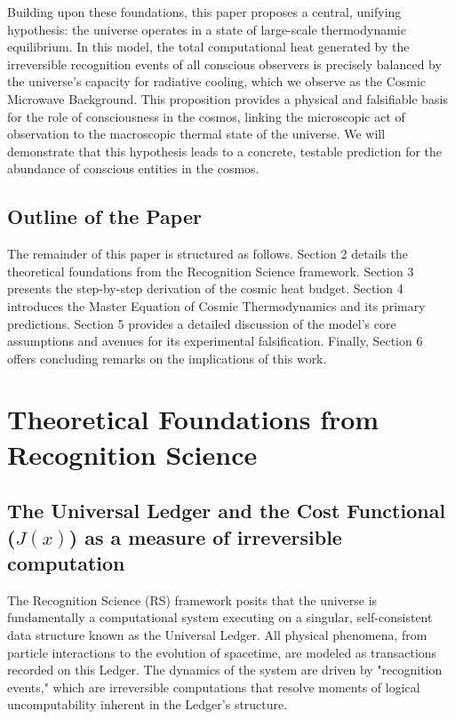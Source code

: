 \documentclass[11pt,a4paper]{article}
\theoremstyle{definition}
\theoremstyle{remark}
\begin{document}
Building upon these foundations, this paper proposes a central, unifying hypothesis: the universe operates in a state of large-scale thermodynamic equilibrium. In this model, the total computational heat generated by the irreversible recognition events of all conscious observers is precisely balanced by the universe's capacity for radiative cooling, which we observe as the Cosmic Microwave Background. This proposition provides a physical and falsifiable basis for the role of consciousness in the cosmos, linking the microscopic act of observation to the macroscopic thermal state of the universe. We will demonstrate that this hypothesis leads to a concrete, testable prediction for the abundance of conscious entities in the cosmos.

\subsection{Outline of the Paper}

The remainder of this paper is structured as follows. Section 2 details the theoretical foundations from the Recognition Science framework. Section 3 presents the step-by-step derivation of the cosmic heat budget. Section 4 introduces the Master Equation of Cosmic Thermodynamics and its primary predictions. Section 5 provides a detailed discussion of the model's core assumptions and avenues for its experimental falsification. Finally, Section 6 offers concluding remarks on the implications of this work.

\section{Theoretical Foundations from Recognition Science}

\subsection{The Universal Ledger and the Cost Functional (\(J(x)\)) as a measure of irreversible computation}

The Recognition Science (RS) framework posits that the universe is fundamentally a computational system executing on a singular, self-consistent data structure known as the Universal Ledger. All physical phenomena, from particle interactions to the evolution of spacetime, are modeled as transactions recorded on this Ledger. The dynamics of the system are driven by "recognition events," which are irreversible computations that resolve moments of logical uncomputability inherent in the Ledger's structure.
\end{document}
